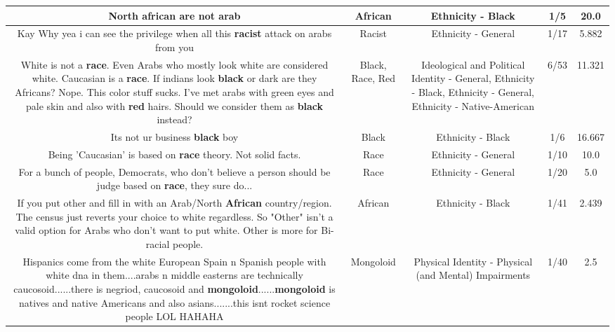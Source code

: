 \documentclass[11pt]{article}
\newlength\mylength
\begin{document}
\begin{center}
\begin{longtable}{|C{.65\mylength}|C{.30\mylength}|C{.12\mylength}|C{.12\mylength}|C{.12\mylength}|}
  \small North \textbf{african} are not arab\normalsize   & African & Ethnicity - Black & 1/5 & 20.0 \\  \hline
  \small Kay Why  yea i can see the privilege when all this \textbf{racist} attack on arabs from you\normalsize   & Racist & Ethnicity - General & 1/17 & 5.882 \\  \hline
  \small White is not a \textbf{race}. Even Arabs who mostly look white are considered white. Caucasian is a \textbf{race}. If indians look \textbf{black} or dark are they Africans? Nope. This color stuff sucks. I've met arabs with green eyes and pale skin and also with \textbf{r\textbf{ed}} hairs. Should we consider them as \textbf{black} instead?\normalsize   & Black, Race, Red &  Ideological and Political Identity - General, Ethnicity - Black, Ethnicity - General, Ethnicity - Native-American & 6/53 & 11.321 \\  \hline
  \small Its not ur business \textbf{black} boy\normalsize   & Black & Ethnicity - Black & 1/6 & 16.667 \\  \hline
  \small Being 'Caucasian' is based on \textbf{race} theory. Not solid facts.\normalsize   & Race & Ethnicity - General & 1/10 & 10.0 \\  \hline
  \small For a bunch of people, Democrats, who don't believe a person should be judge based on \textbf{race}, they sure do...\normalsize   & Race & Ethnicity - General & 1/20 & 5.0 \\  \hline
  \small If you put other and fill in with an Arab/North \textbf{African} country/region. The census just reverts your choice to white regardless. So "Other" isn't a valid option for Arabs who don't want to put white. Other is more for Bi-racial people.\normalsize   & African & Ethnicity - Black & 1/41 & 2.439 \\  \hline
  \small Hispanics come from the white European Spain n Spanish people with white dna in them....arabs n middle easterns are technically caucosoid......there is negriod, caucosoid and \textbf{mongoloid}......\textbf{mongoloid} is natives and native Americans and also asians.......this isnt rocket science people LOL HAHAHA\normalsize   & Mongoloid & Physical Identity - Physical (and Mental) Impairments & 1/40 & 2.5 \\  \hline

\end{longtable}
\end{center}
\end{document}
